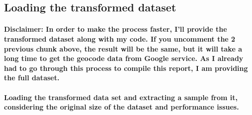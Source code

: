 \documentclass[]{article}
\newenvironment{Shaded}{\begin{snugshade}}{\end{snugshade}}
\newcommand{\KeywordTok}[1]{\textcolor[rgb]{0.13,0.29,0.53}{\textbf{#1}}}
\newcommand{\DataTypeTok}[1]{\textcolor[rgb]{0.13,0.29,0.53}{#1}}
\newcommand{\DecValTok}[1]{\textcolor[rgb]{0.00,0.00,0.81}{#1}}
\newcommand{\StringTok}[1]{\textcolor[rgb]{0.31,0.60,0.02}{#1}}
\newcommand{\CommentTok}[1]{\textcolor[rgb]{0.56,0.35,0.01}{\textit{#1}}}
\newcommand{\OtherTok}[1]{\textcolor[rgb]{0.56,0.35,0.01}{#1}}
\newcommand{\OperatorTok}[1]{\textcolor[rgb]{0.81,0.36,0.00}{\textbf{#1}}}
\newcommand{\NormalTok}[1]{#1}
\let\oldparagraph\paragraph
\renewcommand{\paragraph}[1]{\oldparagraph{#1}\mbox{}}
\begin{document}
\subsection{Loading the transformed
dataset}\label{loading-the-transformed-dataset}

\paragraph{Disclaimer: In order to make the process faster, I'll provide
the transformed dataset along with my code. If you uncomment the 2
previous chunk above, the result will be the same, but it will take a
long time to get the geocode data from Google service. As I already had
to go through this process to compile this report, I am providing the
full
dataset.}\label{disclaimer-in-order-to-make-the-process-faster-ill-provide-the-transformed-dataset-along-with-my-code.-if-you-uncomment-the-2-previous-chunk-above-the-result-will-be-the-same-but-it-will-take-a-long-time-to-get-the-geocode-data-from-google-service.-as-i-already-had-to-go-through-this-process-to-compile-this-report-i-am-providing-the-full-dataset.}

\paragraph{Loading the transformed data set and extracting a sample from
it, considering the original size of the dataset and performance
issues.}\label{loading-the-transformed-data-set-and-extracting-a-sample-from-it-considering-the-original-size-of-the-dataset-and-performance-issues.}

\begin{Shaded}
\end{Shaded}
\end{document}
